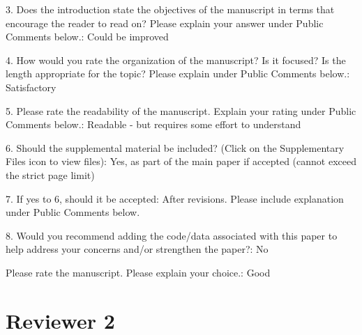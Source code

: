 \documentclass[10pt]{article}
\begin{document}
\begin{spverbatim}

3. Does the introduction state the objectives of the manuscript in terms that encourage the reader to read on? Please explain your answer under Public Comments below.: Could be improved

4. How would you rate the organization of the manuscript? Is it focused? Is the length appropriate for the topic? Please explain under Public Comments below.: Satisfactory

5. Please rate the readability of the manuscript. Explain your rating under Public Comments below.: Readable - but requires some effort to understand

6. Should the supplemental material be included? (Click on the Supplementary Files icon to view files): Yes, as part of the main paper if accepted (cannot exceed the strict page limit)

7. If yes to 6, should it be accepted: After revisions.  Please include explanation under Public Comments below.

8. Would you recommend adding the code/data associated with this paper to help address your concerns and/or strengthen the paper?: No

Please rate the manuscript. Please explain your choice.: Good
\end{spverbatim}


\section{Reviewer 2}
\end{document}
